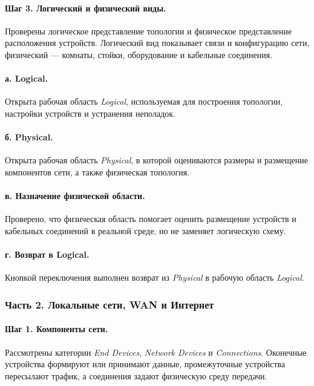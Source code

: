 \documentclass[a4paper,14pt,oneside]{extarticle}
\begin{document}
\paragraph{Шаг 3. Логический и физический виды.}
Проверены логическое представление топологии и физическое представление
расположения устройств. Логический вид показывает связи и конфигурацию
сети, физический --- комнаты, стойки, оборудование и кабельные соединения.

\paragraph{а. Logical.}
Открыта рабочая область \textit{Logical}, используемая для построения
топологии, настройки устройств и устранения неполадок.

\paragraph{б. Physical.}
Открыта рабочая область \textit{Physical}, в которой оцениваются размеры
и размещение компонентов сети, а также физическая топология.

\paragraph{в. Назначение физической области.}
Проверено, что физическая область помогает оценить размещение устройств
и кабельных соединений в реальной среде, но не заменяет логическую схему.

\paragraph{г. Возврат в Logical.}
Кнопкой переключения выполнен возврат из \textit{Physical} в рабочую область
\textit{Logical}.

\subsubsection{Часть 2. Локальные сети, WAN и Интернет}

\paragraph{Шаг 1. Компоненты сети.}
Рассмотрены категории \textit{End Devices}, \textit{Network Devices} и
\textit{Connections}. Оконечные устройства формируют или принимают данные,
промежуточные устройства пересылают трафик, а соединения задают физическую
среду передачи.
\end{document}
